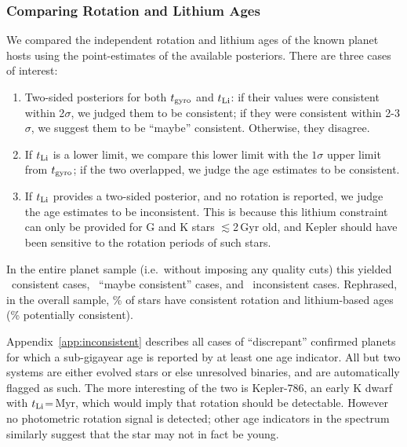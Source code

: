 \documentclass[11pt,twocolumn,tighten]{aastex63}
\begin{document}
\subsubsection{Comparing Rotation and Lithium Ages}

We compared the independent rotation and lithium ages of the
known planet hosts using the point-estimates of the available
posteriors.  There are three cases of interest:

\begin{enumerate}[leftmargin=*,topsep=0pt,itemsep=-1ex,partopsep=1ex,parsep=1ex]
  \item Two-sided posteriors for both $t_{\rm gyro}$ and $t_{\rm Li}$:
    if their values were consistent within 2$\sigma$, we judged them
    to be consistent; if they were consistent within 2-3$\sigma$, we
    suggest them to be ``maybe'' consistent.  Otherwise, they
    disagree.
  \item If $t_{\rm Li}$ is a lower limit, we compare this lower limit
    with the $1\sigma$ upper limit from $t_{\rm gyro}$; if the two
    overlapped, we judge the age estimates to be consistent.
  \item If $t_{\rm Li}$ provides a two-sided posterior, and no
    rotation is reported, we judge the age estimates to be
    inconsistent.  This is because this lithium constraint can only be
    provided for G and K stars $\lesssim$2\,Gyr old, and Kepler should
    have been sensitive to the rotation periods of such stars.
\end{enumerate}

In the entire planet sample (i.e.~without imposing any quality cuts) this
yielded \allagesyesconsistent\ consistent cases,
\allagesmaybeconsistent\ ``maybe consistent'' cases, and
\allagesnoconsistent\ inconsistent cases.  Rephrased, in the overall
sample, \fracconsistentallages\% of stars have consistent rotation and
lithium-based ages (\fracpotentiallyconsistentallages\% potentially
consistent).

Appendix~\ref{app:inconsistent} describes all cases of ``discrepant''
confirmed planets for which a sub-gigayear age is reported by at least
one age indicator.  All but two systems are either evolved stars or
else unresolved binaries, and are automatically flagged as such.  The
more interesting of the two is Kepler-786,
an early K dwarf with $t_{\rm
Li}$=\kepseveneightsix\,Myr, which would imply that rotation should be
detectable.  However no photometric rotation signal is detected; other
age indicators in the spectrum similarly suggest that the star may not
in fact be young. 
\end{document}
